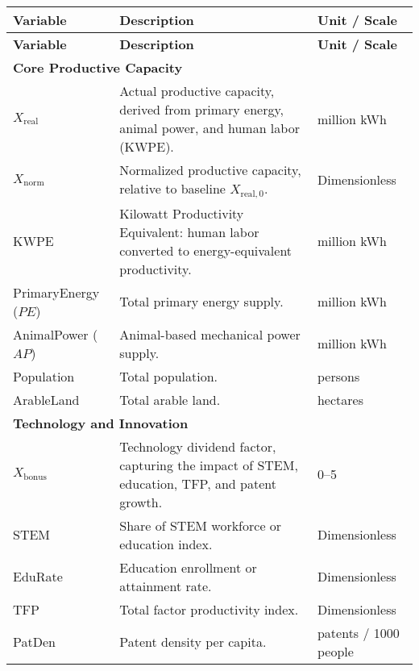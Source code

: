 \documentclass{article}
\begin{document}
\begin{longtable}{p{3cm} p{6cm} p{3cm}}
\hline
\textbf{Variable} & \textbf{Description} & \textbf{Unit / Scale} \\
\hline
\endfirsthead

\hline
\textbf{Variable} & \textbf{Description} & \textbf{Unit / Scale} \\
\hline
\endhead

\multicolumn{3}{l}{\textbf{Core Productive Capacity}} \\
$X_{\mathrm{real}}$   & Actual productive capacity, derived from primary energy, animal power, and human labor (KWPE). & million kWh \\
$X_{\mathrm{norm}}$   & Normalized productive capacity, relative to baseline $X_{\mathrm{real},0}$. & Dimensionless \\
KWPE                  & Kilowatt Productivity Equivalent: human labor converted to energy-equivalent productivity. & million kWh \\
PrimaryEnergy ($PE$)  & Total primary energy supply. & million kWh \\
AnimalPower ($AP$)    & Animal-based mechanical power supply. & million kWh \\
Population            & Total population. & persons \\
ArableLand            & Total arable land. & hectares \\

\multicolumn{3}{l}{\textbf{Technology and Innovation}} \\
$X_{\mathrm{bonus}}$  & Technology dividend factor, capturing the impact of STEM, education, TFP, and patent growth. & 0–5 \\
STEM                  & Share of STEM workforce or education index. & Dimensionless \\
EduRate               & Education enrollment or attainment rate. & Dimensionless \\
TFP                   & Total factor productivity index. & Dimensionless \\
PatDen                & Patent density per capita. & patents / 1000 people \\


\end{longtable}
\end{document}
